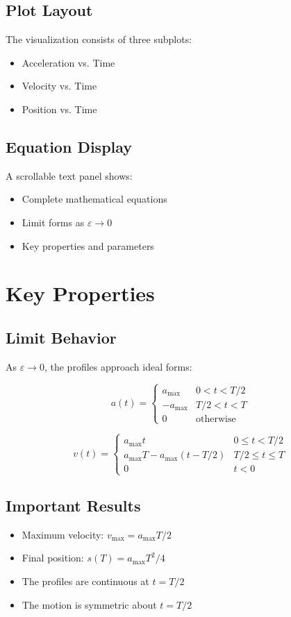 \documentclass[12pt,a4paper]{article}
\begin{document}
\subsection{Plot Layout}
The visualization consists of three subplots:
\begin{itemize}
\item Acceleration vs. Time
\item Velocity vs. Time
\item Position vs. Time
\end{itemize}

\subsection{Equation Display}
A scrollable text panel shows:
\begin{itemize}
\item Complete mathematical equations
\item Limit forms as $\varepsilon \to 0$
\item Key properties and parameters
\end{itemize}

\section{Key Properties}

\subsection{Limit Behavior}
As $\varepsilon \to 0$, the profiles approach ideal forms:

\begin{equation}
a(t) = \begin{cases}
a_{\text{max}} & 0 < t < T/2 \\
-a_{\text{max}} & T/2 < t < T \\
0 & \text{otherwise}
\end{cases}
\end{equation}

\begin{equation}
v(t) = \begin{cases}
a_{\text{max}}t & 0 \leq t < T/2 \\
a_{\text{max}}T - a_{\text{max}}(t-T/2) & T/2 \leq t \leq T \\
0 & t < 0
\end{cases}
\end{equation}

\subsection{Important Results}
\begin{itemize}
\item Maximum velocity: $v_{\text{max}} = a_{\text{max}}T/2$
\item Final position: $s(T) = a_{\text{max}}T^2/4$
\item The profiles are continuous at $t = T/2$
\item The motion is symmetric about $t = T/2$
\end{itemize}
\end{document}
